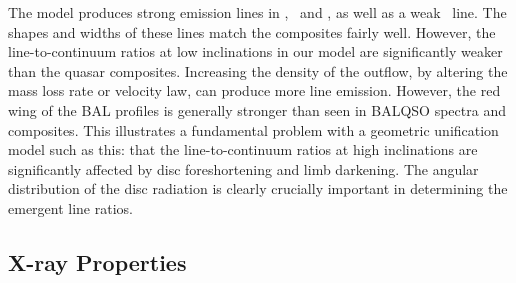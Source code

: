 \documentclass[useAMS,usenatbib]{mn2e_x}
\begin{document}
The model produces strong emission lines in \civ, \nv\ and \la,
as well as a weak \mg\ line. The shapes and widths of these lines
match the composites fairly well. However, the line-to-continuum ratios 
at low inclinations in our model are significantly weaker than the quasar 
composites. Increasing the density of the outflow, by altering the mass 
loss rate  or velocity law, can produce more line emission.
However, the red wing of the BAL profiles is generally stronger than 
seen in BALQSO spectra and composites. This illustrates a fundamental 
problem with a geometric unification model such as this:
that the line-to-continuum ratios at high inclinations are
significantly affected by disc foreshortening and limb darkening.
The angular distribution of the disc radiation is clearly
crucially important in determining the emergent line ratios.  



\subsection{X-ray Properties}
\label{sec:xray}
\end{document}
